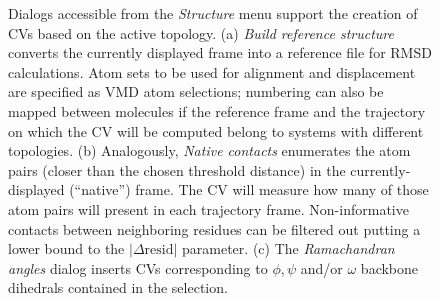 \documentclass[preprint,review,11pt]{elsarticle}
\begin{document}
\begin{figure}
  \centering
  \caption{Dialogs accessible from the \emph{Structure} menu support
    the creation of CVs based on the active topology. (a) \emph{Build
      reference structure} converts the currently displayed frame into
    a reference file for RMSD calculations.  Atom sets to be used for
    alignment and displacement are specified as VMD atom selections;
    numbering can also be mapped between molecules if the reference
    frame and the trajectory on which the CV will be computed belong
    to systems with different topologies. (b) Analogously,
    \emph{Native contacts} enumerates  the atom pairs (closer
    than the chosen threshold distance) in the currently-displayed
    (``native'') frame. The CV will measure how many of
    those atom pairs will present in each trajectory frame. 
    Non-informative contacts between neighboring residues can be
    filtered out putting a lower bound to the $| \Delta \mbox{resid}
    |$ parameter. (c) The \emph{Ramachandran angles} dialog inserts
    CVs corresponding to $\phi, \psi$ and/or $\omega$ backbone
    dihedrals contained in the selection.}\label{fig:structure}
\end{figure}
\end{document}
